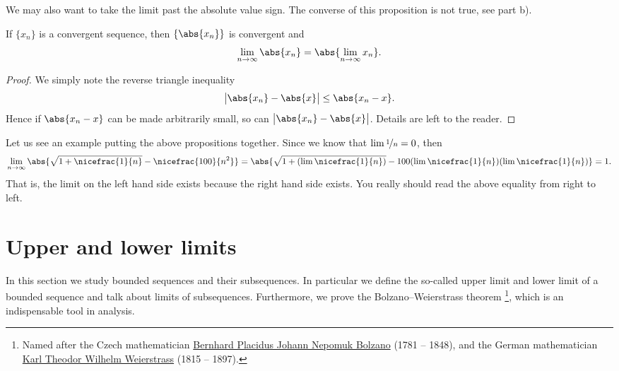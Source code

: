 \documentclass[12pt]{book}
\begin{document}
We may also want to take the limit past the absolute value sign.
The converse of this proposition is not true, see
 part b).

\begin{prop}
If $\{ x_n \}$ is a convergent sequence, then $\{ \abs{x_n} \}$
is convergent and
\begin{equation*}
\lim_{n\to\infty} \abs{x_n} = 
\abs{\lim_{n\to\infty} x_n} .
\end{equation*}
\end{prop}

\begin{proof}
We simply note the reverse triangle inequality
\begin{equation*}
\big\lvert \abs{x_n} - \abs{x} \big\rvert \leq \abs{x_n-x} .
\end{equation*}
Hence if $\abs{x_n -x}$ can be made arbitrarily small, so can
$\big\lvert \abs{x_n} - \abs{x} \big\rvert$.
Details are left to the reader.
\end{proof}

Let us see an example putting the above propositions together.  Since
we know that $\lim \nicefrac{1}{n} = 0$, then
\begin{equation*}
\lim_{n\to \infty}
\abs{\sqrt{1 + \nicefrac{1}{n}} - \nicefrac{100}{n^2}} =  
\abs{\sqrt{1 + (\lim \nicefrac{1}{n})} - 100 (\lim \nicefrac{1}{n})(\lim
\nicefrac{1}{n})} = 1.
\end{equation*}
That is, the limit on the left hand side exists because the right hand
side exists.
You really should read the above equality from right to left.



\sectionnewpage
\section{Upper and lower limits}

In this section we study bounded sequences and their subsequences.
In particular we define the so-called upper limit and lower limit
of a bounded sequence and talk about limits of subsequences.
Furthermore, we prove the
Bolzano--Weierstrass theorem%
\footnote{%
Named after the Czech mathematician
\href{http://en.wikipedia.org/wiki/Bernard_Bolzano}{Bernhard Placidus Johann Nepomuk Bolzano}
(1781 -- 1848), and the German mathematician
\href{http://en.wikipedia.org/wiki/Karl_Weierstrass}{Karl Theodor Wilhelm Weierstrass}
(1815 -- 1897).}, which is an
indispensable tool in analysis.
\end{document}
